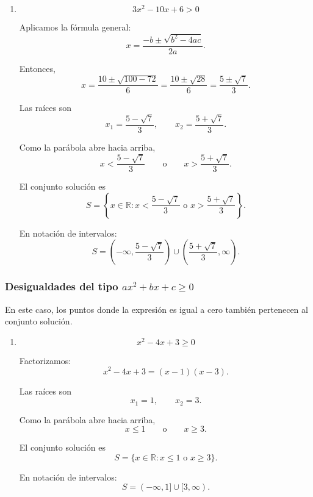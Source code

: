 \documentclass[12pt]{article}
\theoremstyle{plain}
\theoremstyle{definition}
\theoremstyle{remark}
\begin{document}
{\begin{enumerate}
Representación gráfica:
\[
\longleftarrow\!\!=\!\!=\!\circ
\quad -1
\qquad\qquad
\frac{1}{2}\quad
\circ\!\!=\!\!=\!\longrightarrow
\]

\item
\[
3x^2-10x+6>0
\]

Aplicamos la fórmula general:
\[
x=
\frac{-b\pm\sqrt{b^2-4ac}}{2a}.
\]

Entonces,
\[
x
=
\frac{10\pm\sqrt{100-72}}{6}
=
\frac{10\pm\sqrt{28}}{6}
=
\frac{5\pm\sqrt{7}}{3}.
\]

Las raíces son
\[
x_1=\frac{5-\sqrt{7}}{3},
\qquad
x_2=\frac{5+\sqrt{7}}{3}.
\]

Como la parábola abre hacia arriba,
\[
x<
\frac{5-\sqrt{7}}{3}
\qquad\text{o}\qquad
x>
\frac{5+\sqrt{7}}{3}.
\]

El conjunto solución es
\[
\boxed{
S=
\left\{
x\in\mathbb{R}:
x<
\frac{5-\sqrt{7}}{3}
\text{ o }
x>
\frac{5+\sqrt{7}}{3}
\right\}.
}
\]

En notación de intervalos:
\[
\boxed{
S=
\left(
-\infty,
\frac{5-\sqrt{7}}{3}
\right)
\cup
\left(
\frac{5+\sqrt{7}}{3},
\infty
\right).
}
\]

\end{enumerate}

\subsubsection*{Desigualdades del tipo \(ax^2+bx+c\geq 0\)}
En este caso, los puntos donde la expresión es igual a cero también
pertenecen al conjunto solución.

\begin{enumerate}

\item
\[
x^2-4x+3\geq0
\]

Factorizamos:
\[
x^2-4x+3=(x-1)(x-3).
\]

Las raíces son
\[
x_1=1,
\qquad
x_2=3.
\]

Como la parábola abre hacia arriba,
\[
x\leq1
\qquad\text{o}\qquad
x\geq3.
\]

El conjunto solución es
\[
\boxed{
S=
\{x\in\mathbb{R}:x\leq1\text{ o }x\geq3\}.
}
\]

En notación de intervalos:
\[
\boxed{
S=(-\infty,1]\cup[3,\infty).
}
\]


\end{enumerate}}
\end{document}
